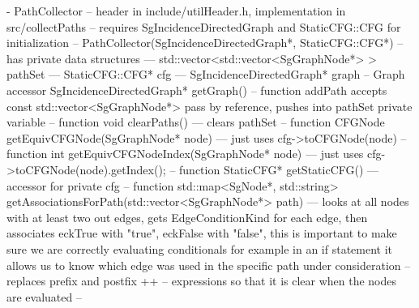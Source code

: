 - PathCollector
-- header in include/utilHeader.h, implementation in src/collectPaths
-- requires SgIncidenceDirectedGraph and StaticCFG::CFG for initialization
-- PathCollector(SgIncidenceDirectedGraph*, StaticCFG::CFG*)
-- has private data structures
--- std::vector<std::vector<SgGraphNode*> > pathSet
--- StaticCFG::CFG* cfg
--- SgIncidenceDirectedGraph* graph
-- Graph accessor SgIncidenceDirectedGraph* getGraph()
-- function addPath accepts const std::vector<SgGraphNode*> pass by reference, pushes into pathSet private variable
-- function void clearPaths()
--- clears pathSet
-- function CFGNode getEquivCFGNode(SgGraphNode* node)
--- just uses cfg->toCFGNode(node)
-- function int getEquivCFGNodeIndex(SgGraphNode* node)
--- just uses cfg->toCFGNode(node).getIndex();
-- function StaticCFG* getStaticCFG() 
--- accessor for private cfg
-- function std::map<SgNode*, std::string> getAssociationsForPath(std::vector<SgGraphNode*> path)
--- looks at all nodes with at least two out edges, gets EdgeConditionKind for each edge, then associates eckTrue with "true", eckFalse with "false", this is important to make sure we are correctly evaluating conditionals for example in an if statement it allows us to know which edge was used in the specific path under consideration
-- replaces prefix and postfix ++ -- expressions so that it is clear when the nodes are evaluated
-- 
